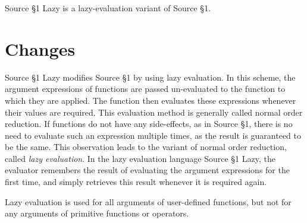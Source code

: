 





Source \S 1 Lazy is a lazy-evaluation variant of Source \S 1.

\section{Changes}

Source \S 1 Lazy modifies Source \S 1 by using
lazy evaluation. In
this scheme, the argument expressions of functions are passed un-evaluated
to the function to which they are applied. The function then evaluates
these expressions whenever their values are required. This evaluation method
is generally called normal order reduction. If functions
do not have any side-effects, as in Source \S 1,
there is no need to evaluate such an expression
multiple times, as the result is guaranteed to be the same. This observation
leads to the variant of normal order reduction, called \emph{lazy evaluation}.
In the lazy evaluation language Source \S 1 Lazy,
the evaluator remembers the result of evaluating the
argument expressions for the first time, and simply retrieves this result
whenever it is required again.

Lazy evaluation is used for all arguments of user-defined functions, but
not for any arguments of primitive functions or operators.





\newpage


























    
